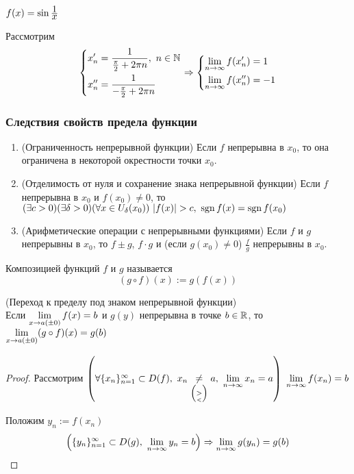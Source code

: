 \begin{example}
	$f(x) = \sin \frac{\displaystyle 1}{\displaystyle x}$
	
	Рассмотрим
	$$
		\left\{\begin{aligned}
		&{x'_n = \frac{1}{\frac{\pi}{2} + 2\pi n},\ n \in \mathbb{N}}
		\\
		&{x''_n = \frac{1}{-\frac{\pi}{2} + 2\pi n}}
		\end{aligned}\right.
		\Rightarrow
		\left\{\begin{aligned}
		&{\lim\limits_{n \to \infty} f(x'_n) = 1}
		\\
		&{\lim\limits_{n \to \infty} f(x''_n) = -1}
		\end{aligned}\right.
	$$
\end{example}

\subsubsection*{Следствия свойств предела функции}

\begin{enumerate}
	\item (Ограниченность непрерывной функции) Если $f$ непрерывна в $x_0$, то она ограничена в некоторой окрестности точки $x_0$.
	
	\item (Отделимость от нуля и сохранение знака непрерывной функции)
	Если $f$ непрерывна в $x_0$ и $f(x_0) \neq 0$, то 
	$(\exists c > 0)(\exists \delta > 0)(\forall x \in U_\delta (x_0))\ |f(x)| > c,
	\ \operatorname{sgn} f(x) = \operatorname{sgn} f(x_0)$

	\item (Арифметические операции с непрерывными функциями) Если $f$ и $g$ непрерывны в $x_0$, то $f \pm g$, $f \cdot g$ и (если $g(x_0) \neq 0$) $\frac{f}{g}$ непрерывны в $x_0$.
\end{enumerate}

\begin{definition}
	Композицией функций $f$ и $g$ называется 
	$$
		(g \circ f)(x) := g(f(x))
	$$
\end{definition}

\begin{theorem} (Переход к пределу под знаком непрерывной функции) \\
	Если $\lim\limits_{x \to a(\pm 0)} f(x) = b$ и $g(y)$ непрерывна в точке
	$b \in \mathbb{R}$, то $\lim\limits_{x \to a(\pm 0)} (g \circ f)(x) = g(b)$
\end{theorem}

\begin{proof}
	Рассмотрим $\left(\forall \{x_n\}_{n = 1}^\infty \subset D(f),
	\ x_n \underset{\left(\underset{<}{>}\right)}{\neq} a,\ \liml_{n \to \infty} x_n = a\right)\ \liml_{n \to \infty} f(x_n) = b$
	
	Положим $y_n := f(x_n)$
	$$
		\left(\{y_n\}_{n = 1}^\infty \subset D(g),
		\ \lim\limits_{n \to \infty} y_n = b\right) \Rightarrow
		\lim\limits_{n \to \infty} g(y_n) = g(b) 
	$$
\end{proof}

